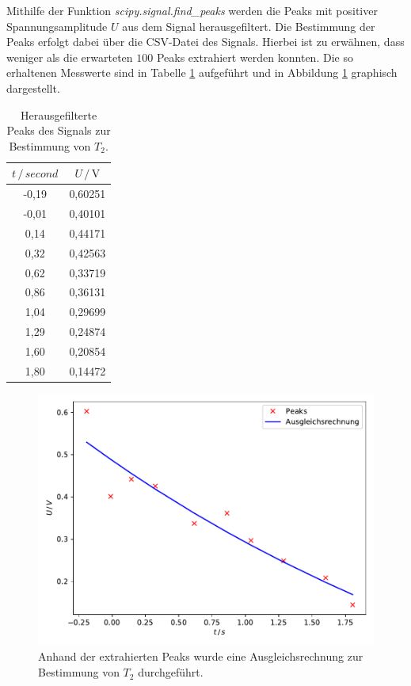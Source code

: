 Mithilfe der Funktion \textit{scipy.signal.find\_peaks}\cite{scipy} 
werden die Peaks mit positiver Spannungsamplitude $U$ aus dem Signal herausgefiltert. Die Bestimmung der Peaks erfolgt 
dabei über die CSV-Datei des Signals. Hierbei ist zu erwähnen, dass weniger als die erwarteten $100$ Peaks extrahiert werden 
konnten.
Die so erhaltenen Messwerte sind in Tabelle \ref{tab:mess2} aufgeführt und in Abbildung \ref{fig:plot2} 
graphisch dargestellt. 

\begin{table}
  \centering
  \caption{Herausgefilterte Peaks des Signals zur Bestimmung von $T_2$.}
  \label{tab:mess2}
  \begin{tabular}{c c}
  \toprule
  $t \,/\, \si{second}$ & $U \,/\, \si{\volt}$\\
  \midrule 
      -0,19 & 0,60251\\
      -0,01 & 0,40101\\
       0,14 & 0,44171\\
       0,32 & 0,42563\\
       0,62 & 0,33719\\
       0,86 & 0,36131\\
       1,04 & 0,29699\\
       1,29 & 0,24874\\
       1,60 & 0,20854\\
       1,80 & 0,14472\\
  \bottomrule
  \end{tabular}
\end{table}

\begin{figure}
  \centering
  \includegraphics[scale=0.7]{content/plot2.pdf}
  \caption{Anhand der extrahierten Peaks wurde eine Ausgleichsrechnung zur Bestimmung von $T_2$ durchgeführt.}
  \label{fig:plot2}
\end{figure}

